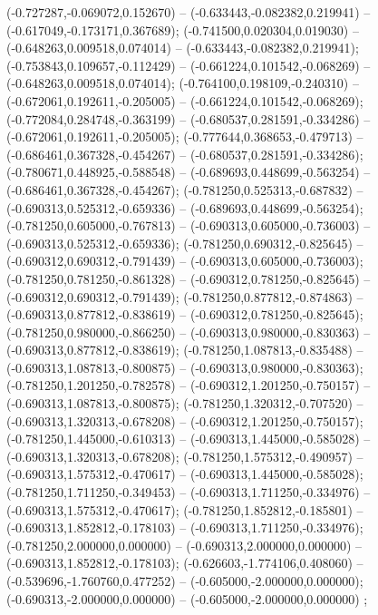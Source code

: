  (-0.727287,-0.069072,0.152670) -- (-0.633443,-0.082382,0.219941) -- (-0.617049,-0.173171,0.367689);
 (-0.741500,0.020304,0.019030) -- (-0.648263,0.009518,0.074014) -- (-0.633443,-0.082382,0.219941);
 (-0.753843,0.109657,-0.112429) -- (-0.661224,0.101542,-0.068269) -- (-0.648263,0.009518,0.074014);
 (-0.764100,0.198109,-0.240310) -- (-0.672061,0.192611,-0.205005) -- (-0.661224,0.101542,-0.068269);
 (-0.772084,0.284748,-0.363199) -- (-0.680537,0.281591,-0.334286) -- (-0.672061,0.192611,-0.205005);
 (-0.777644,0.368653,-0.479713) -- (-0.686461,0.367328,-0.454267) -- (-0.680537,0.281591,-0.334286);
 (-0.780671,0.448925,-0.588548) -- (-0.689693,0.448699,-0.563254) -- (-0.686461,0.367328,-0.454267);
 (-0.781250,0.525313,-0.687832) -- (-0.690313,0.525312,-0.659336) -- (-0.689693,0.448699,-0.563254);
 (-0.781250,0.605000,-0.767813) -- (-0.690313,0.605000,-0.736003) -- (-0.690313,0.525312,-0.659336);
 (-0.781250,0.690312,-0.825645) -- (-0.690312,0.690312,-0.791439) -- (-0.690313,0.605000,-0.736003);
 (-0.781250,0.781250,-0.861328) -- (-0.690312,0.781250,-0.825645) -- (-0.690312,0.690312,-0.791439);
 (-0.781250,0.877812,-0.874863) -- (-0.690313,0.877812,-0.838619) -- (-0.690312,0.781250,-0.825645);
 (-0.781250,0.980000,-0.866250) -- (-0.690313,0.980000,-0.830363) -- (-0.690313,0.877812,-0.838619);
 (-0.781250,1.087813,-0.835488) -- (-0.690313,1.087813,-0.800875) -- (-0.690313,0.980000,-0.830363);
 (-0.781250,1.201250,-0.782578) -- (-0.690312,1.201250,-0.750157) -- (-0.690313,1.087813,-0.800875);
 (-0.781250,1.320312,-0.707520) -- (-0.690313,1.320313,-0.678208) -- (-0.690312,1.201250,-0.750157);
 (-0.781250,1.445000,-0.610313) -- (-0.690313,1.445000,-0.585028) -- (-0.690313,1.320313,-0.678208);
 (-0.781250,1.575312,-0.490957) -- (-0.690313,1.575312,-0.470617) -- (-0.690313,1.445000,-0.585028);
 (-0.781250,1.711250,-0.349453) -- (-0.690313,1.711250,-0.334976) -- (-0.690313,1.575312,-0.470617);
 (-0.781250,1.852812,-0.185801) -- (-0.690313,1.852812,-0.178103) -- (-0.690313,1.711250,-0.334976);
 (-0.781250,2.000000,0.000000) -- (-0.690313,2.000000,0.000000) -- (-0.690313,1.852812,-0.178103);
 (-0.626603,-1.774106,0.408060) -- (-0.539696,-1.760760,0.477252) -- (-0.605000,-2.000000,0.000000);
 (-0.690313,-2.000000,0.000000) -- (-0.605000,-2.000000,0.000000) ;
